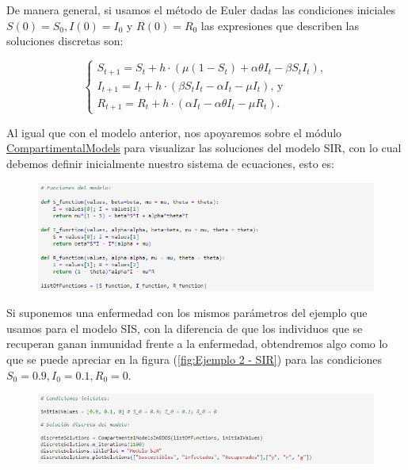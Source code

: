 De manera general, si usamos el método de Euler dadas las condiciones iniciales $S(0)=S_0,I(0)=I_0$ y $R(0)=R_0$ las expresiones que describen las soluciones discretas son:

$$\left\{\begin{array}{l}
S_{t+1} = S_t + h\cdot(\mu(1 - S_t) + \alpha\theta I_t - \beta S_t I_t), \\
I_{t+1} = I_t + h\cdot(\beta S_t I_t - \alpha I_t - \mu I_t)\text{, y} \\
R_{t+1} = R_t + h\cdot(\alpha I_t - \alpha\theta I_t - \mu R_t).
\end{array}\right.$$

Al igual que con el modelo anterior, nos apoyaremos sobre el módulo \href{https://grupo-de-simulacion-con-automatas.github.io/CAsimulations-Modelacion-de-dinamicas-topologicas-en-la-propagacion-de-una-enfermedad-usando-CA/#:~:text=CellSpaceConfiguration-,CompartmentalModelsInEDOS,-Con\%20este\%20m\%C3\%B3dulo}{\underline{CompartimentalModels}} para visualizar las soluciones del modelo SIR, con lo cual debemos definir inicialmente nuestro sistema de ecuaciones, esto es:

\begin{figure}[h]
  \centering
    \includegraphics[width=1\textwidth]{Imagenes/compartimentalModels3.png}
\end{figure}

Si suponemos una enfermedad con los mismos parámetros del ejemplo que usamos para el modelo SIS, con la diferencia de que los individuos que se recuperan ganan inmunidad frente a la enfermedad, obtendremos algo como lo que se puede apreciar en la figura (\ref{fig:Ejemplo 2 - SIR}) para las condiciones $S_0=0.9,I_0=0.1,R_0=0$.


\begin{figure}[h]
  \centering
    \includegraphics[width=1\textwidth]{Imagenes/compartimentalModels4.png}
\end{figure}

